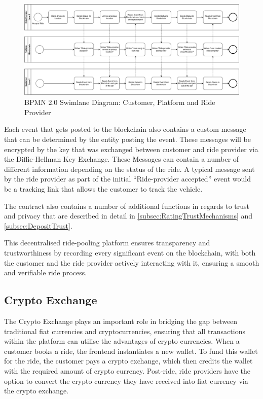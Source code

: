 \begin{figure}[h]
    \centering
    \includegraphics[width=\linewidth]{data/1.svg}
    \caption{BPMN 2.0 Swimlane Diagram: Customer, Platform and Ride Provider}
    \label{fig:SwimLaneCustomer}
\end{figure}


Each event that gets posted to the blockchain also contains a custom message that can be determined by the entity posting the event. These messages will be encrypted by the key that was exchanged between customer and ride provider via the Diffie-Hellman Key Exchange. These Messages can contain a number of different information depending on the status of the ride. A typical message sent by the ride provider as part of the initial ``Ride-provider accepted'' event would be a tracking link that allows the customer to track the vehicle. 

The contract also contains a number of additional functions in regards to trust and privacy that are described in detail in \ref{subsec:RatingTrustMechanisms} and \ref{subsec:DepositTrust}.

This decentralised ride-pooling platform ensures transparency and trustworthiness by recording every significant event on the blockchain, with both the customer and the ride provider actively interacting with it, ensuring a smooth and verifiable ride process.


\subsection{Crypto Exchange}\label{subsec:CryptoExchange}

The Crypto Exchange plays an important role in bridging the gap between traditional fiat currencies and cryptocurrencies, ensuring that all transactions within the platform can utilise the advantages of crypto currencies. When a customer books a ride, the frontend instantiates a new wallet. To fund this wallet for the ride, the customer pays a crypto exchange, which then credits the wallet with the required amount of crypto currency. Post-ride, ride providers have the option to convert the crypto currency they have received into fiat currency via the crypto exchange.


